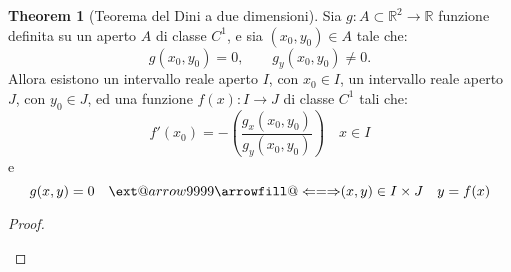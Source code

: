 \documentclass[leqno]{article}
\makeatletter
\newcommand\xLeftrightarrow[2][]{%
	\ext@arrow 9999{\Longleftrightarrowfill@}{#1}{#2}}
\newcommand\Longleftrightarrowfill@{%
	\arrowfill@\Leftarrow\Relbar\Rightarrow}
\theoremstyle{definition}
\numberwithin{equation}{section}
\newtheorem{theorem}{Theorem}[section]
\theoremstyle{remark}
\makeatother
\begin{document}
	\begin{theorem}[Teorema del Dini a due dimensioni]
		Sia $g:A\subset \mathbb{R}^2 \rightarrow \mathbb{R}$ funzione definita su un aperto $A$ di classe $C^1$, e sia $(x_{0},y_{0})\in A$ tale che: 
		\begin{equation}
			g(x_{0},y_{0})=0,\qquad g_{y}(x_{0},y_{0})\neq 0.
		\end{equation}
		Allora esistono un intervallo reale aperto $I$, con $x_0 \in I$, un intervallo reale aperto $J$, con $y_0 \in J$, ed una funzione $f(x): I \rightarrow J$ di classe $C^1$ tali che:
		\begin{equation}
			f'(x_{0})=-\left({\frac {g_{x}(x_{0},y_{0})}{g_{y}(x_{0},y_{0})}}\right) \quad x\in I
		\end{equation}
		e 
		\begin{equation}
			g(x,y)=0 \quad \xLeftrightarrow{\text{$(x,y)\in I\times J$}} \quad y=f(x)
		\end{equation}
		\begin{proof}
			
			\begin{description}
				

\end{description}
\end{proof}
\end{theorem}
\end{document}
